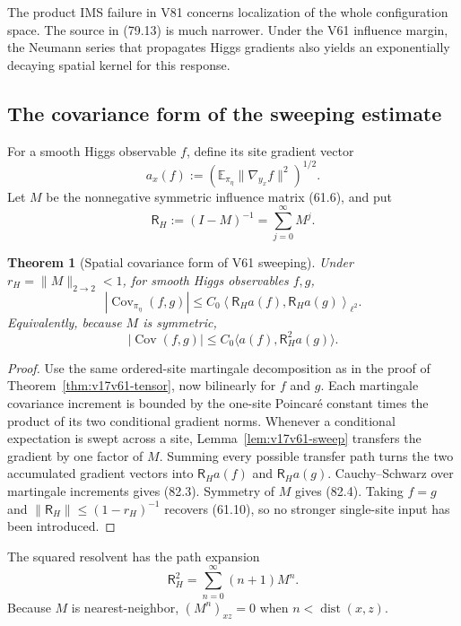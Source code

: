 \documentclass[11pt]{article}
\newtheorem{theorem}{Theorem}[section]
\theoremstyle{remark}
\begin{document}
The product IMS failure in V81 concerns localization of the whole
configuration space.  The source in (79.13) is much narrower.  Under
the V61 influence margin, the Neumann series that propagates Higgs
gradients also yields an exponentially decaying spatial kernel for
this response.

\subsection{The covariance form of the sweeping estimate}

For a smooth Higgs observable \(f\), define its site gradient vector
\[
 a_x(f):=
 \left(\mathbb E_{\pi_\eta}
 \|\nabla_{y_x}f\|^2\right)^{1/2}.                \tag{82.1}
\]
Let \(M\) be the nonnegative symmetric influence matrix (61.6), and
put
\[
 \mathsf R_H:=(I-M)^{-1}=\sum_{j=0}^\infty M^j.   \tag{82.2}
\]

\begin{theorem}[Spatial covariance form of V61 sweeping]
\label{thm:v17v82-covariance}
Under \(r_H=\|M\|_{2\to2}<1\), for smooth Higgs observables \(f,g\),
\[
\boxed{
 |\operatorname{Cov}_{\pi_\eta}(f,g)|
 \leq C_0
 \left\langle\mathsf R_Ha(f),
                    \mathsf R_Ha(g)\right\rangle_{\ell^2}.}     \tag{82.3}
\]
Equivalently, because \(M\) is symmetric,
\[
 |\operatorname{Cov}(f,g)|
 \leq C_0\langle a(f),\mathsf R_H^2a(g)\rangle.   \tag{82.4}
\]
\end{theorem}

\begin{proof}
Use the same ordered-site martingale decomposition as in the proof of
Theorem~\ref{thm:v17v61-tensor}, now bilinearly for \(f\) and \(g\).
Each martingale covariance increment is bounded by the one-site
Poincar\'e constant times the product of its two conditional gradient
norms.  Whenever a conditional expectation is swept across a site,
Lemma~\ref{lem:v17v61-sweep} transfers the gradient by one factor of
\(M\).  Summing every possible transfer path turns the two accumulated
gradient vectors into \(\mathsf R_Ha(f)\) and
\(\mathsf R_Ha(g)\).  Cauchy--Schwarz over martingale increments gives
(82.3).  Symmetry of \(M\) gives (82.4).  Taking \(f=g\) and
\(\|\mathsf R_H\|\leq(1-r_H)^{-1}\) recovers (61.10), so no stronger
single-site input has been introduced.
\end{proof}

The squared resolvent has the path expansion
\[
 \mathsf R_H^2
 =\sum_{n=0}^\infty(n+1)M^n.                     \tag{82.5}
\]
Because \(M\) is nearest-neighbor, \((M^n)_{xz}=0\) when
\(n<\operatorname{dist}(x,z)\).
\end{document}
